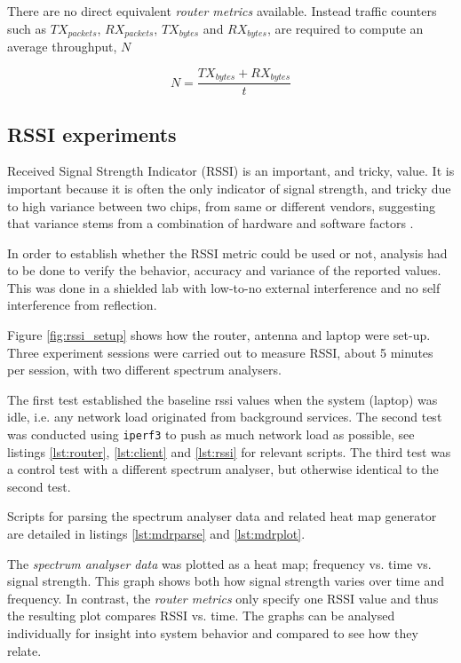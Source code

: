 There are no direct equivalent \emph{router metrics} available. Instead traffic counters such as $TX_{packets}$,
$RX_{packets}$, $TX_{bytes}$ and $RX_{bytes}$, are required to compute an average throughput, $N$

\begin{equation}
N = \frac{TX_{bytes} + RX_{bytes}}{t}
\end{equation}

\subsection{RSSI experiments}

Received Signal Strength Indicator (RSSI) is an important, and tricky, value. It
is important because it is often the only indicator of signal strength, and
tricky due to high variance between two chips, from same or different vendors,
suggesting that variance stems from a combination of hardware and software
factors \cite{lui}.

In order to establish whether the RSSI metric could be used or not, analysis had
to be done to verify the behavior, accuracy and variance of the reported values.
This was done in a shielded lab with low-to-no external interference and no self
interference from reflection.

Figure \ref{fig:rssi_setup} shows how the router, antenna and laptop were
set-up. Three experiment sessions were carried out to measure RSSI, about 5
minutes per session, with two different spectrum analysers.

The first test established the baseline rssi values when the system (laptop) was
idle, i.e. any network load originated from background services. The second test
was conducted using \texttt{iperf3} to push as much network load as possible,
see listings \ref{lst:router}, \ref{lst:client} and \ref{lst:rssi} for relevant
scripts. The third test was a control test with a different spectrum analyser,
but otherwise identical to the second test.

Scripts for parsing the spectrum analyser data and related heat map generator
are detailed in listings \ref{lst:mdrparse} and \ref{lst:mdrplot}.

The \emph{spectrum analyser data} was plotted as a heat map; frequency vs. time
vs. signal strength. This graph shows both how signal strength varies over time
and frequency. In contrast, the \emph{router metrics} only specify one RSSI
value and thus the resulting plot compares RSSI vs. time. The graphs can be
analysed individually for insight into system behavior and compared to see how
they relate.

